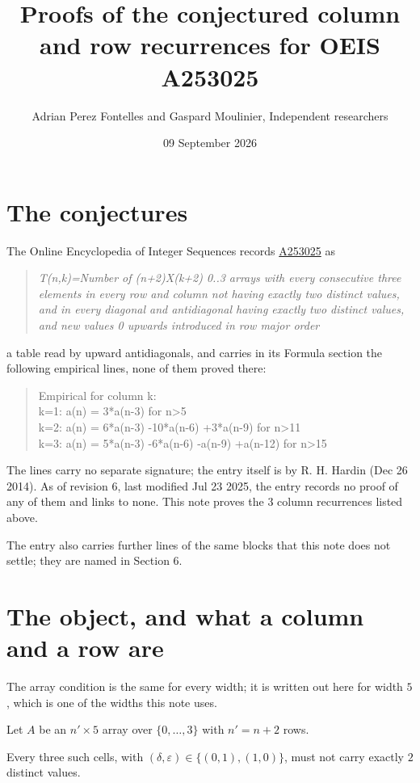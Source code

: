 \documentclass[11pt]{article}
\title{Proofs of the conjectured column and row recurrences for OEIS A253025}
\author{Adrian Perez Fontelles and Gaspard Moulinier, Independent researchers}
\date{09 September 2026}
\theoremstyle{definition}
\begin{document}
\maketitle
\section{The conjectures}

The Online Encyclopedia of Integer Sequences records \href{https://oeis.org/A253025}{A253025} as

\begin{quote}\itshape T(n,k)=Number of (n+2)X(k+2) 0..3 arrays with every consecutive three elements in every row and column not having exactly two distinct values, and in every diagonal and antidiagonal having exactly two distinct values, and new values 0 upwards introduced in row major order\end{quote}

a table read by upward antidiagonals, and carries in its Formula section the following empirical lines, none of them proved there:

\begin{quote}\ttfamily Empirical for column k:\\
k=1: a(n) = 3*a(n-3) for n>5\\k=2: a(n) = 6*a(n-3) -10*a(n-6) +3*a(n-9) for n>11\\k=3: a(n) = 5*a(n-3) -6*a(n-6) -a(n-9) +a(n-12) for n>15\end{quote}

The lines carry no separate signature; the entry itself is by R. H. Hardin (Dec 26 2014). As of revision 6, last modified Jul 23 2025, the entry records no proof of any of them and links to none. This note proves the 3 column recurrences listed above.

The entry also carries further lines of the same blocks that this note does not settle; they are named in Section 6.

\section{The object, and what a column and a row are}

The array condition is the same for every width; it is written out here for width $5$, which is one of the widths this note uses.

Let $A$ be an $n' \times 5$ array over $\{0,\dots,3\}$ with $n' = n + 2$ rows.

Every three such cells, with $(\delta,\varepsilon) \in \{(0,1), (1,0)\}$, must not carry exactly $2$ distinct values.
\end{document}
